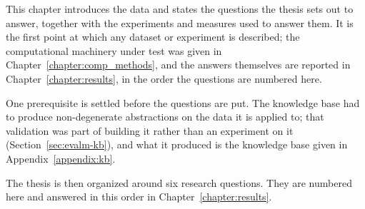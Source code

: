 \label{sec:method-evaluation}
This chapter introduces the data and states the questions the thesis sets out to
answer, together with the experiments and measures used to answer them. It is
the first point at which any dataset or experiment is described; the
computational machinery under test was given in
Chapter~\ref{chapter:comp_methods}, and the answers themselves are reported in
Chapter~\ref{chapter:results}, in the order the questions are numbered here.

One prerequisite is settled before the questions are put. The knowledge base
had to produce non-degenerate abstractions on the data it is applied to; that
validation was part of building it rather than an experiment on it
(Section~\ref{sec:evalm-kb}), and what it produced is the knowledge base given
in Appendix~\ref{appendix:kb}.

The thesis is then organized around six research questions. They are numbered
here and answered in this order in Chapter~\ref{chapter:results}.

